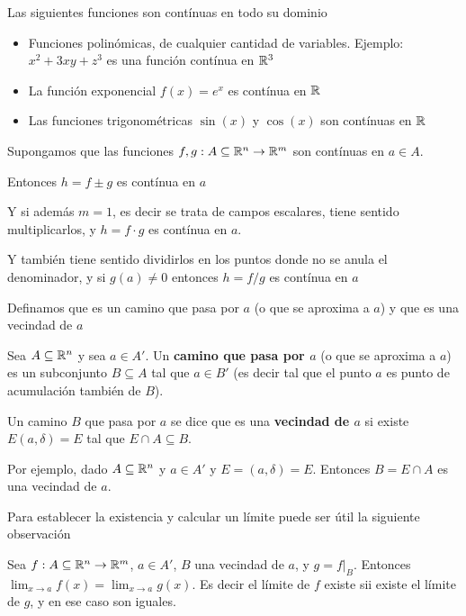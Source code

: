 \begin{proposition}

Las siguientes funciones son contínuas en todo su dominio

\begin{itemize}
\item Funciones polinómicas, de cualquier cantidad de variables.
Ejemplo: $x^2 + 3xy + z^3$ es una función contínua en $\mathbb{R}^3$

\item La función exponencial $f(x) = e^x$ es contínua en $\mathbb{R}$

\item Las funciones trigonométricas $\sin(x)$ y $\cos(x)$ son contínuas en $\mathbb{R}$
\end{itemize}

Supongamos que las funciones $f, g : A \subseteq \mathbb{R}^n \to \mathbb{R}^m$ son contínuas en $a \in A$. 

Entonces $h = f \pm g$ es contínua en $a$

Y si además $m=1$, es decir se trata de campos escalares, tiene sentido multiplicarlos, y $h = f \cdot g$ es contínua en $a$.

Y también tiene sentido dividirlos en los puntos donde no se anula el denominador, y si $g(a) \neq 0$ entonces $h = f/g$ es contínua en $a$
\end{proposition}

Definamos que es un camino que pasa por $a$ (o que se aproxima a $a$) y que es una vecindad de $a$

\begin{definition}
Sea $A \subseteq \mathbb{R}^n$ y sea $a \in A'$.  Un \textbf{camino que pasa por $a$} (o que se aproxima a $a$) es un subconjunto $B \subseteq A$ tal que $a \in B'$ (es decir tal que el punto $a$ es punto de acumulación también de $B$).

Un camino $B$ que pasa por $a$ se dice que es una \textbf{vecindad de $a$} si existe $E(a,\delta) = E$ tal que $E \cap A \subseteq B$.
\end{definition}

\begin{example}
Por ejemplo, dado $A \subseteq \mathbb{R}^n$ y $a \in A'$ y $E = (a, \delta) = E$.  Entonces $B = E \cap A$ es una vecindad de $a$.
\end{example}

Para establecer la existencia y calcular un límite puede ser útil la siguiente observación

\begin{observation}\label{camino_vecindad}
Sea $f: A \subseteq \mathbb{R}^n \to \mathbb{R}^m$, $a \in A'$, $B$ una vecindad de $a$, y $g = f|_B$.  Entonces $\lim_{x \to a} f(x) = \lim_{x \to a} g(x)$.  Es decir el límite de $f$ existe sii existe el límite de $g$, y en ese caso son iguales.
\end{observation}

